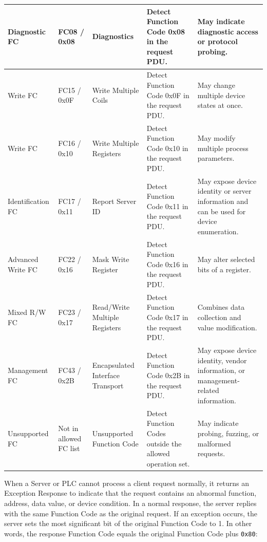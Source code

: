 \begin{table}[htbp]
{\begin{tabular}{|>{\centering\arraybackslash}m{2.6cm}|>{\centering\arraybackslash}m{2.0cm}|>{\centering\arraybackslash}m{2.8cm}|m{4.2cm}|m{4.8cm}|}
Diagnostic FC & FC08 / 0x08 & Diagnostics & Detect Function Code 0x08 in the request PDU. & May indicate diagnostic access or protocol probing. \\ \hline

Write FC & FC15 / 0x0F & Write Multiple Coils & Detect Function Code 0x0F in the request PDU. & May change multiple device states at once. \\ \hline

Write FC & FC16 / 0x10 & Write Multiple Registers & Detect Function Code 0x10 in the request PDU. & May modify multiple process parameters. \\ \hline

Identification FC & FC17 / 0x11 & Report Server ID & Detect Function Code 0x11 in the request PDU. & May expose device identity or server information and can be used for device enumeration. \\ \hline

Advanced Write FC & FC22 / 0x16 & Mask Write Register & Detect Function Code 0x16 in the request PDU. & May alter selected bits of a register. \\ \hline

Mixed R/W FC & FC23 / 0x17 & Read/Write Multiple Registers & Detect Function Code 0x17 in the request PDU. & Combines data collection and value modification. \\ \hline

Management FC & FC43 / 0x2B & Encapsulated Interface Transport & Detect Function Code 0x2B in the request PDU. & May expose device identity, vendor information, or management-related information. \\ \hline

Unsupported FC & Not in allowed FC list & Unsupported Function Code & Detect Function Codes outside the allowed operation set. & May indicate probing, fuzzing, or malformed requests. \\ \hline

\end{tabular}%
}
\label{tab:modbus_rules_final}
\end{table}
\newpage
When a Server or PLC cannot process a client request normally, it returns an
Exception Response to indicate that the request contains an abnormal
function, address, data value, or device condition. In a normal response,
the server replies with the same Function Code as the original request.
If an exception occurs, the server sets the most significant bit of the
original Function Code to 1. In other words, the response Function Code
equals the original Function Code plus \texttt{0x80}:

